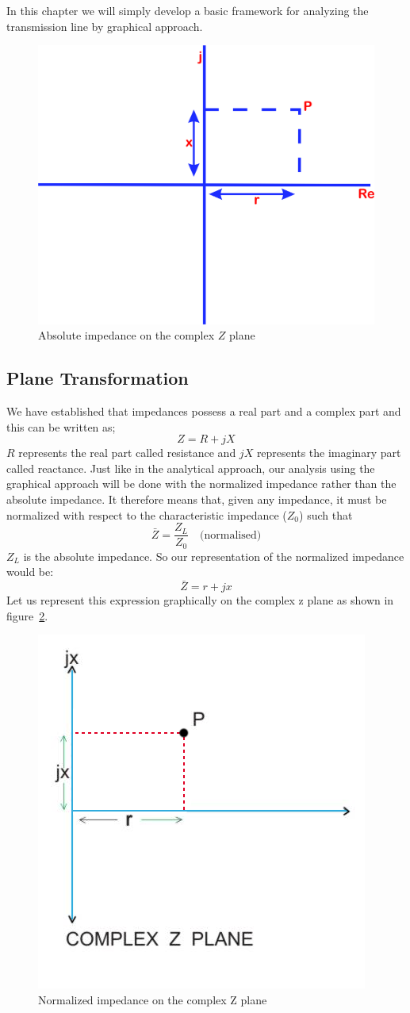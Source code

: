 In this chapter we will simply develop a basic framework for analyzing the transmission line by graphical approach.
\begin{figure}[h]
\centering
\includegraphics[width=0.5\linewidth]{./graphics/mjhdj}
\caption{Absolute impedance on the complex $Z$ plane}
\label{fig:mjhdj}
\end{figure}

\subsection{Plane Transformation}
We have established that impedances possess a real part and a complex part and this can be written as;
\begin{equation*}
Z= R+jX
\end{equation*}
$R$ represents the real part called resistance and $jX$ represents the imaginary part called reactance. Just like in the analytical approach, our analysis using the graphical approach will be done with the normalized impedance rather than the absolute impedance. It therefore means that, given any impedance, it must be normalized with respect to the characteristic impedance ($Z_0$) such that
\begin{equation*}
\bar{Z}=\frac{Z_L}{Z_0} \quad \text{(normalised)}
\end{equation*}
$Z_L$ is the absolute impedance. So our representation of the normalized impedance would be:
\begin{equation*}
\bar{Z}= r + jx
\end{equation*}
Let us represent this expression graphically on the complex z plane as shown in figure~\ref{fig:transline2}.
\begin{figure}[h]
\center\includegraphics[width=0.5\linewidth]{./graphics/TransLine2 RETOUCHED}
\caption{Normalized impedance on the complex Z plane}
\label{fig:transline2}
\end{figure}

